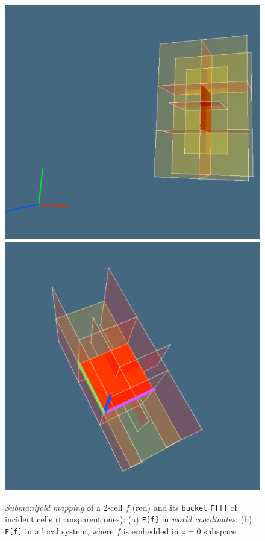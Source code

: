 \documentclass[11pt, oneside]{article}   	%
\begin{document}
\begin{figure}[htbp] %
   \centering
   \includegraphics[width=0.5\textheight,width=0.51\textwidth]{submanifold1} 
   \includegraphics[width=0.49\textheight,width=0.47\textwidth]{submanifold3} 
   \caption{\emph{Submanifold mapping} of a 2-cell $f$ (red) and its  \texttt{bucket} \texttt{F[f]} of incident cells (transparent ones): (a) \texttt{F[f]} in \emph{world coordinates}; (b) \texttt{F[f]} in a local system, where $f$ is embedded in $z=0$ subspace.}
   \label{fig:testWall}
\end{figure}
\end{document}
